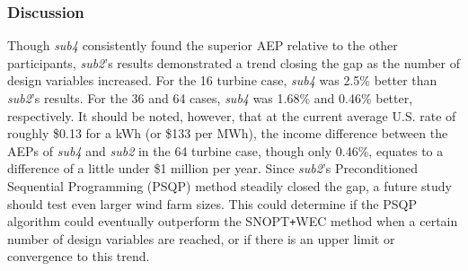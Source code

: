 



\subsubsection{Discussion}


	Though \textit{sub4} consistently found the superior AEP relative to the other participants, \textit{sub2}'s results demonstrated a trend closing the gap as the number of design variables increased.
	For the 16 turbine case, \textit{sub4} was 2.5\% better than \textit{sub2}'s results.
	For the 36 and 64 cases, \textit{sub4} was 1.68\% and 0.46\% better, respectively.
	It should be noted, however, that at the current average U.S. rate \cite{ChooseEnergyCost} of roughly \$0.13 for a kWh (or \$133 per MWh), the income difference between the AEPs of \textit{sub4} and \textit{sub2} in the 64 turbine case, though only 0.46\%, equates to a difference of a little under \$1 million per year.
	Since \textit{sub2}'s Preconditioned Sequential Programming (PSQP) method steadily closed the gap, a future study should test even larger wind farm sizes.
	This could determine if the PSQP algorithm could eventually outperform the SNOPT\texttt{+}WEC method when a certain number of design variables are reached, or if there is an upper limit or convergence to this trend.

